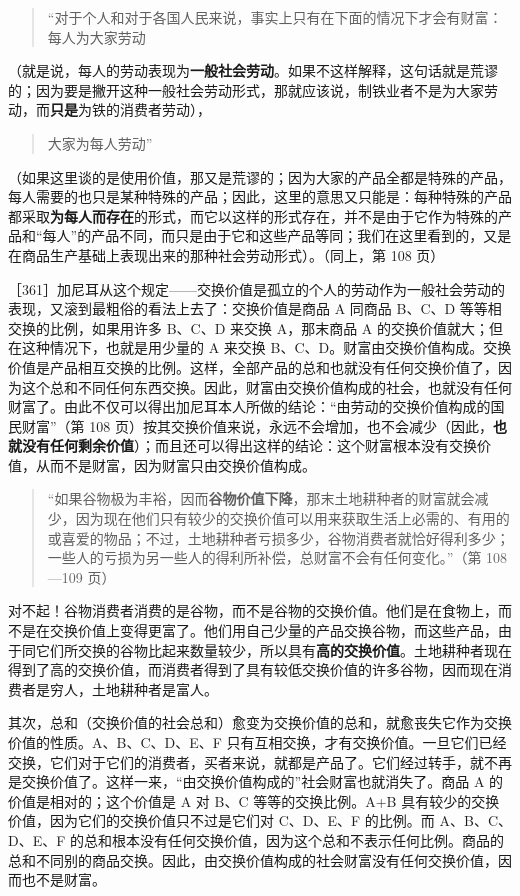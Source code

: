 \begin{quote}“对于个人和对于各国人民来说，事实上只有在下面的情况下才会有财富：每人为大家劳动\end{quote}

（就是说，每人的劳动表现为\textbf{一般社会劳动}。如果不这样解释，这句话就是荒谬的；因为要是撇开这种一般社会劳动形式，那就应该说，制铁业者不是为大家劳动，而\textbf{只是}为铁的消费者劳动），

\begin{quote}大家为每人劳动”\end{quote}

（如果这里谈的是使用价值，那又是荒谬的；因为大家的产品全都是特殊的产品，每人需要的也只是某种特殊的产品；因此，这里的意思又只能是：每种特殊的产品都采取\textbf{为每人而存在}的形式，而它以这样的形式存在，并不是由于它作为特殊的产品和“每人”的产品不同，而只是由于它和这些产品等同；我们在这里看到的，又是在商品生产基础上表现出来的那种社会劳动形式）。（同上，第 108 页）

［361］加尼耳从这个规定——交换价值是孤立的个人的劳动作为一般社会劳动的表现，又滚到最粗俗的看法上去了：交换价值是商品 A 同商品 B、C、D 等等相交换的比例，如果用许多 B、C、D 来交换 A，那末商品 A 的交换价值就大；但在这种情况下，也就是用少量的 A 来交换 B、C、D。财富由交换价值构成。交换价值是产品相互交换的比例。这样，全部产品的总和也就没有任何交换价值了，因为这个总和不同任何东西交换。因此，财富由交换价值构成的社会，也就没有任何财富了。由此不仅可以得出加尼耳本人所做的结论：“由劳动的交换价值构成的国民财富”（第 108 页）按其交换价值来说，永远不会增加，也不会减少（因此，\textbf{也就没有任何剩余价值}）；而且还可以得出这样的结论：这个财富根本没有交换价值，从而不是财富，因为财富只由交换价值构成。

\begin{quote}“如果谷物极为丰裕，因而\textbf{谷物价值下降}，那末土地耕种者的财富就会减少，因为现在他们只有较少的交换价值可以用来获取生活上必需的、有用的或喜爱的物品；不过，土地耕种者亏损多少，谷物消费者就恰好得利多少；一些人的亏损为另一些人的得利所补偿，总财富不会有任何变化。”（第 108—109 页）\end{quote}

对不起！谷物消费者消费的是谷物，而不是谷物的交换价值。他们是在食物上，而不是在交换价值上变得更富了。他们用自己少量的产品交换谷物，而这些产品，由于同它们所交换的谷物比起来数量较少，所以具有\textbf{高的交换价值}。土地耕种者现在得到了高的交换价值，而消费者得到了具有较低交换价值的许多谷物，因而现在消费者是穷人，土地耕种者是富人。

其次，总和（交换价值的社会总和）愈变为交换价值的总和，就愈丧失它作为交换价值的性质。A、B、C、D、E、F 只有互相交换，才有交换价值。一旦它们已经交换，它们对于它们的消费者，买者来说，就都是产品了。它们经过转手，就不再是交换价值了。这样一来，“由交换价值构成的”社会财富也就消失了。商品 A 的价值是相对的；这个价值是 A 对 B、C 等等的交换比例。A+B 具有较少的交换价值，因为它们的交换价值只不过是它们对 C、D、E、F 的比例。而 A、B、C、D、E、F 的总和根本没有任何交换价值，因为这个总和不表示任何比例。商品的总和不同别的商品交换。因此，由交换价值构成的社会财富没有任何交换价值，因而也不是财富。


